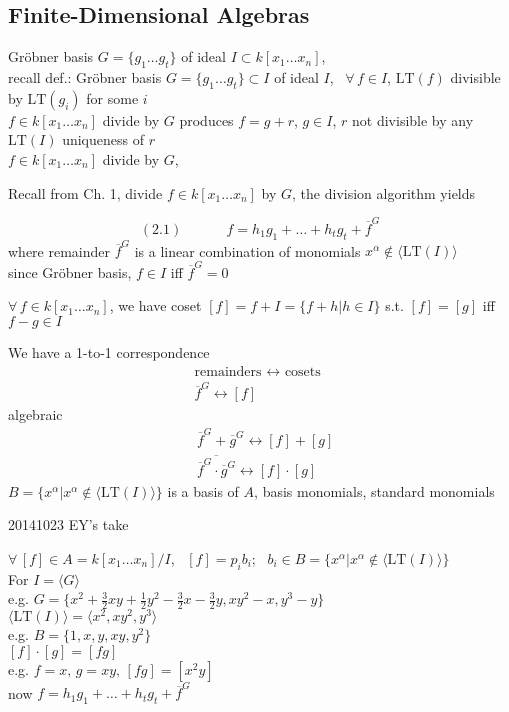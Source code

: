\documentclass[10pt]{amsart}
\begin{document}
\begin{multicols*}{2}
\subsection{Finite-Dimensional Algebras}

Gr\"obner basis $G = \lbrace g_1 \dots g_t \rbrace$ of ideal $I\subset k[x_1\dots x_n]$, \\
recall def.: Gr\"obner basis $G = \lbrace g_1 \dots g_t\rbrace \subset I$ of ideal $I$, \, $\forall \, f \in I$, $\text{LT}(f)$ divisible by $\text{LT}(g_i)$ for some $i$ \\
\phantom{\quad \, } $f \in k[x_1\dots x_n]$ divide by $G$ produces $f=g+r$, $g\in I$, $r$ not divisible by any $\text{LT}(I)$ uniqueness of $r$ \\
$f\in k[x_1 \dots x_n]$ divide by $G$, 

Recall from Ch. 1, divide $f\in k[x_1 \dots x_n]$ by $G$, the division algorithm yields

\begin{equation}
  (2.1)  \quad \quad \quad \, f = h_1 g_1 + \dots + h_t g_t + \overline{f}^G
\end{equation}
where remainder $\overline{f}^G$ is a linear combination of monomials $x^{\alpha} \notin \langle \text{LT}(I) \rangle $ \\
\phantom{\quad } since Gr\"obner basis, $f\in I$ iff $\overline{f}^G=0$

$\forall \, f \in k[x_1\dots x_n]$, we have coset $[f] = f+I = \lbrace f +h|h\in I\rbrace$ s.t. $[f]=[g]$ iff $f- g \in I$

We have a 1-to-1 correspondence 
\[
\begin{gathered}
\text{remainders } \leftrightarrow \text{ cosets } \\
\overline{f}^G \leftrightarrow [f]
\end{gathered}
\]
algebraic
\[
\begin{aligned}
  & \overline{f}^G + \overline{g}^G \leftrightarrow [f] + [g] \\ 
  & \overline{ \overline{f}^G \cdot \overline{g}^G } \leftrightarrow [f]\cdot [g]
\end{aligned}
\]
$B = \lbrace x^{\alpha} | x^{\alpha} \notin \langle \text{LT}(I) \rangle \rbrace$ is a basis of $A$, basis monomials, standard monomials

20141023 EY's take

$\forall \, [f] \in A = k[x_1 \dots x_n]/I$, \, $[f] = p_ib_i$; \, $b_i \in B = \lbrace x^{\alpha} | x^{\alpha} \notin \langle \text{LT}(I) \rangle \rbrace$ \\
For $I = \langle G \rangle$ \\
\phantom{\quad } e.g. $G=\lbrace x^2 + \frac{3}{2} xy + \frac{1}{2} y^2 - \frac{3}{2} x - \frac{3}{2} y, xy^2-x, y^3-y \rbrace$ \\
$\langle \text{LT}(I) \rangle = \langle x^2, xy^2,y^3 \rangle$ \\
e.g. $B=\lbrace 1,x,y,xy,y^2\rbrace$ \\
\phantom{\quad } $[f]\cdot[g] = [fg]$ \\
e.g. $f=x, \, g=xy, \, [fg] = [x^2y]$ \\
now $f=h_1g_1 + \dots +h_tg_t+ \overline{f}^G$


\end{multicols*}
\end{document}
